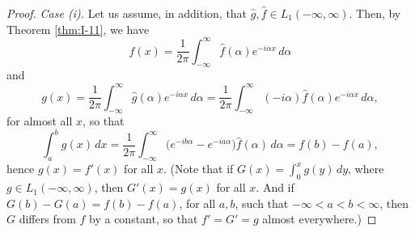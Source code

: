 \begin{proof}
\emph{Case (i).} Let us assume, in addition, that $\widehat g,\widehat f\in L_1(-\infty,\infty)$. Then, by Theorem \ref{thm:I-11}, we have
\begin{equation*}
f(x)=\frac{1}{2\pi}\int_{-\infty}^{\infty}\widehat f(\alpha)e^{-i\alpha x}\,d\alpha
\end{equation*}
and
\begin{equation*}
g(x)=\frac{1}{2\pi}\int_{-\infty}^{\infty}\widehat g(\alpha)e^{-i\alpha x}\,d\alpha
=\frac{1}{2\pi}\int_{-\infty}^{\infty}(-i\alpha)\widehat f(\alpha)e^{-i\alpha x}\,d\alpha,
\end{equation*}
for almost all $x$, so that
\begin{equation*}
\int_{a}^{b}g(x)\,dx
=\frac{1}{2\pi}\int_{-\infty}^{\infty}\bigl(e^{-ib\alpha}-e^{-ia\alpha}\bigr)\widehat f(\alpha)\,d\alpha
=f(b)-f(a),
\end{equation*}
hence $g(x)=f'(x)$ for all $x$. (Note that if $G(x)=\int_0^x g(y)\,dy$, where $g\in L_1(-\infty,\infty)$, then $G'(x)=g(x)$ for all $x$. And if $G(b)-G(a)=f(b)-f(a)$, for all $a,b$, such that $-\infty<a<b<\infty$, then $G$ differs from $f$ by a constant, so that $f'=G'=g$ almost everywhere.)


\end{proof}
